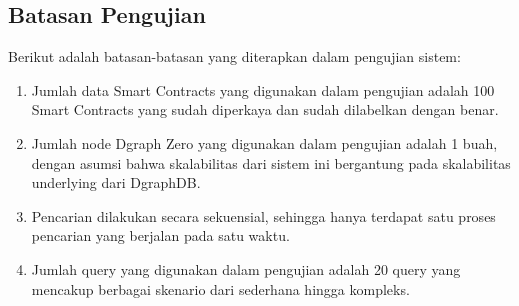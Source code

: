 \subsection{Batasan Pengujian}

Berikut adalah batasan-batasan yang diterapkan dalam pengujian sistem:
\begin{enumerate}
	\item Jumlah data Smart Contracts yang digunakan dalam pengujian adalah 100 Smart Contracts yang sudah diperkaya dan sudah dilabelkan dengan benar.
	\item Jumlah node Dgraph Zero yang digunakan dalam pengujian adalah 1 buah, dengan asumsi bahwa skalabilitas dari sistem ini bergantung pada skalabilitas underlying dari DgraphDB.
	\item Pencarian dilakukan secara sekuensial, sehingga hanya terdapat satu proses pencarian yang berjalan pada satu waktu.
	\item Jumlah query yang digunakan dalam pengujian adalah 20 query yang mencakup berbagai skenario dari sederhana hingga kompleks.
\end{enumerate}